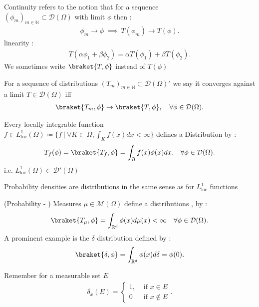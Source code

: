 \begin{remark}
  Continuity  refers to the notion that for a sequence \\  $(\phi_m)_{m \in  \mathbb{N}} \subset  \mathcal{D}(\Omega )$  with limit $\phi $ then : 
  \begin{align*}
    \phi_m \to \phi  \ \implies \ T(\phi_m) \to  T(\phi )
  .\end{align*}
  linearity : 
  \begin{align*}
    T(\alpha \phi_1 + \beta \phi_2) = \alpha T(\phi_1) + \beta T(\phi_2)
  .\end{align*}
  We sometimes write $\braket{T,\phi}$ instead of $T(\phi )$
\end{remark}
\begin{definition}[Convergence]
  For a sequence of distributions $(T_m)_{m \in  \mathbb{N}} \subset  \mathcal{D}(\Omega )'$  we say it converges against a limit $T \in \mathcal{D}(\Omega)$  iff 
  \begin{align*}
    \braket{T_m,\phi } \to  \braket{T,\phi } , \quad \forall \phi  \in  \mathcal{D}(\Omega )
  .\end{align*}
\end{definition}
\begin{example}
  Every locally integrable function $ f \in  L_{\text{loc}}^{1}(\Omega ) \coloneqq  \{f \ | \ \forall K \subset  \Omega , \int_K f(x) dx < \infty \}  $  defines a Distribution by    : 
  \begin{align*}
    T_f(\phi )  = \braket{T_f,\phi } = \int_\Omega f(x) \phi(x) dx . \quad \forall \phi \in \mathcal{D}(\Omega)
  .\end{align*}
  i.e. $L_{\text{loc}}^{1}(\Omega ) \subset  \mathcal{D}'(\Omega ) $
\end{example}
\begin{example}
  Probability densities are distributions in the same sense as for $L_{\text{loc}}^{1} $ functions
\end{example}
\begin{example}
  (Probability - ) Measures $ \mu  \in  \mathcal{M}(\Omega )$ define  a distributions , by : 
  \begin{align*}
    \braket{T_\mu ,\phi } = \int_{\mathbb{R}^{d} } \phi(x) d\mu(x) < \infty \quad \forall \phi \in \mathcal{D}(\Omega)
  .\end{align*}
  A prominent example is the $\delta $ distribution defined by : 
  \begin{align*}
    \braket{\delta ,\phi } = \int_{\mathbb{R}^{d} } \phi(x) d \delta   = \phi(0)
  .\end{align*}
  \begin{myblock}
   Remember for a measurable set $E$ 
   \begin{align*}
    \delta_x(E) = \begin{cases}
      1, &\text{ if }x \in  E \\
      0  &\text{ if }x \not\in E
    \end{cases}
   .\end{align*}
  \end{myblock}
\end{example}
